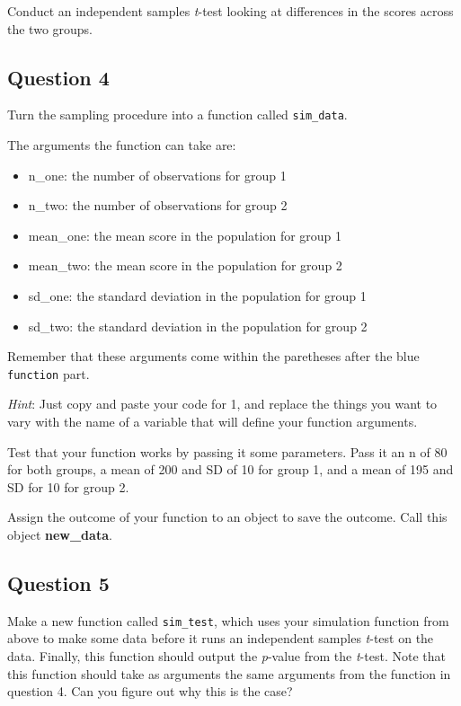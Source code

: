 \documentclass[
]{book}
\providecommand{\tightlist}{%
  \setlength{\itemsep}{0pt}\setlength{\parskip}{0pt}}
\begin{document}
Conduct an independent samples \emph{t}-test looking at differences in the scores across the two groups.

\hypertarget{question-4-7}{%
\subsection{Question 4}\label{question-4-7}}

Turn the sampling procedure into a function called \texttt{sim\_data}.

The arguments the function can take are:

\begin{itemize}
\tightlist
\item
  n\_one: the number of observations for group 1
\item
  n\_two: the number of observations for group 2
\item
  mean\_one: the mean score in the population for group 1
\item
  mean\_two: the mean score in the population for group 2
\item
  sd\_one: the standard deviation in the population for group 1
\item
  sd\_two: the standard deviation in the population for group 2
\end{itemize}

Remember that these arguments come within the paretheses after the blue \texttt{function} part.

\emph{Hint}: Just copy and paste your code for 1, and replace the things you want to vary with the name of a variable that will define your function arguments.

Test that your function works by passing it some parameters. Pass it an n of 80 for both groups, a mean of 200 and SD of 10 for group 1, and a mean of 195 and SD for 10 for group 2.

Assign the outcome of your function to an object to save the outcome. Call this object \textbf{new\_data}.

\hypertarget{question-5-7}{%
\subsection{Question 5}\label{question-5-7}}

Make a new function called \texttt{sim\_test}, which uses your simulation function from above to make some data before it runs an independent samples \emph{t}-test on the data. Finally, this function should output the \emph{p}-value from the \emph{t}-test. Note that this function should take as arguments the same arguments from the function in question 4. Can you figure out why this is the case?
\end{document}
